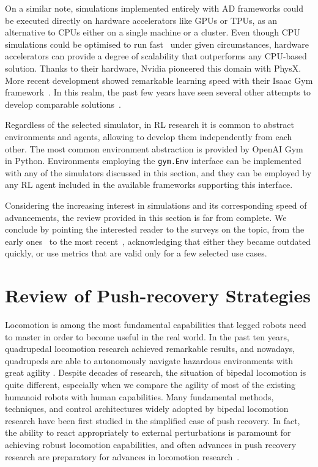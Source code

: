 On a similar note, simulations implemented entirely with \ac{AD} frameworks could be executed directly on hardware accelerators like \acp{GPU} or \acp{TPU}, as an alternative to \acp{CPU} either on a single machine or a cluster.
Even though \ac{CPU} simulations could be optimised to run fast~\parencite{hwangbo_per-contact_2018} under given circumstances, hardware accelerators can provide a degree of scalability that outperforms any \ac{CPU}-based solution.
Thanks to their hardware, Nvidia pioneered this domain with PhysX.
More recent development showed remarkable learning speed with their Isaac Gym framework~\parencite{liangGPUAcceleratedRoboticSimulation2018s, makoviychuk_isaac_2021, rudin_learning_2021}.
In this realm, the past few years have seen several other attempts to develop comparable solutions~\parencite{heiden_neuralsim_2021, qiao_efficient_2021, freeman_brax_2021}.

Regardless of the selected simulator, in \ac{RL} research it is common to abstract environments and agents, allowing to develop them independently from each other.
The most common environment abstraction is provided by OpenAI Gym~\parencite{brockman_openai_2016} in Python.
Environments employing the \verb|gym.Env| interface can be implemented with any of the simulators discussed in this section, and they can be
employed by any \ac{RL} agent included in the available frameworks supporting this interface.

Considering the increasing interest in simulations and its corresponding speed of advancements, the review provided in this section is far from complete.
We conclude by pointing the interested reader to the surveys on the topic, from the early ones~\parencite{ivaldiToolsSimulatingHumanoid2014s,erezSimulationToolsModelbased2015s} to the most recent~\parencite{collins_review_2021, kim_survey_2021, korber_comparing_2021}, acknowledging that either they became outdated quickly, or use metrics that are valid only for a few selected use cases.

\section{Review of Push-recovery Strategies}

Locomotion is among the most fundamental capabilities that legged robots need to master in order to become useful in the real world.
In the past ten years, quadrupedal locomotion research achieved remarkable results, and nowadays, quadrupeds are able to autonomously navigate hazardous environments with great agility \parencite{lee_learning_2020, miki_learning_2022}.
Despite decades of research, the situation of bipedal locomotion is quite different, especially when we compare the agility of most of the existing humanoid robots with human capabilities.
Many fundamental methods, techniques, and control architectures widely adopted by bipedal locomotion research have been first studied in the simplified case of push recovery.
In fact, the ability to react appropriately to external perturbations is paramount for achieving robust locomotion capabilities, and often advances in push recovery research are preparatory for advances in locomotion research~\parencite{jeong_robust_2019}.

